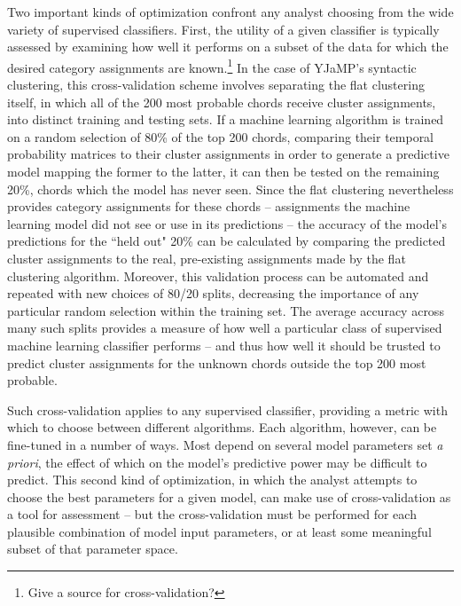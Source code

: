 Two important kinds of optimization confront any analyst choosing from the wide variety of supervised classifiers.  First, the utility of a given classifier is typically assessed by examining how well it performs on a subset of the data for which the desired category assignments are known.\footnote{Give a source for cross-validation?}  In the case of YJaMP's syntactic clustering, this cross-validation scheme involves separating the flat clustering itself, in which all of the 200 most probable chords receive cluster assignments, into distinct training and testing sets.  If a machine learning algorithm is trained on a random selection of 80\% of the top 200 chords, comparing their temporal probability matrices to their cluster assignments in order to generate a predictive model mapping the former to the latter, it can then be tested on the remaining 20\%, chords which the model has never seen.  Since the flat clustering nevertheless provides category assignments for these chords -- assignments the machine learning model did not see or use in its predictions -- the accuracy of the model's predictions for the ``held out" 20\% can be calculated by comparing the predicted cluster assignments to the real, pre-existing assignments made by the flat clustering algorithm.  Moreover, this validation process can be automated and repeated with new choices of 80/20 splits, decreasing the importance of any particular random selection within the training set.  The average accuracy across many such splits provides a measure of how well a particular class of supervised machine learning classifier performs -- and thus how well it should be trusted to predict cluster assignments for the unknown chords outside the top 200 most probable.


Such cross-validation applies to any supervised classifier, providing a metric with which to choose between different algorithms.  Each algorithm, however, can be fine-tuned in a number of ways.  Most depend on several model parameters set \emph{a priori}, the effect of which on the model's predictive power may be difficult to predict.  This second kind of optimization, in which the analyst attempts to choose the best parameters for a given model, can make use of cross-validation as a tool for assessment -- but the cross-validation must be performed for each plausible combination of model input parameters, or at least some meaningful subset of that parameter space.

